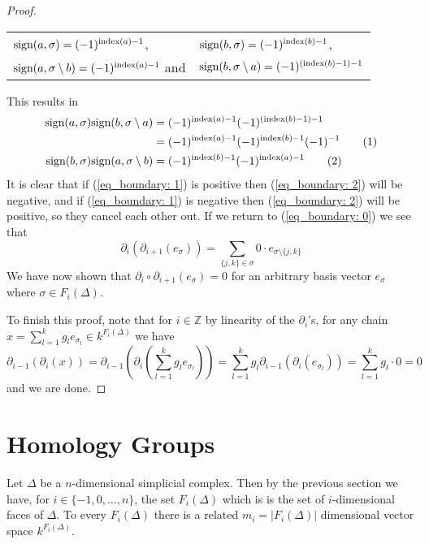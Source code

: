 \documentclass[11pt,a4paper,twoside]{report}
\newcommand\numberthis{\addtocounter{equation}{1}\tag{\theequation}}
\begin{document}
\begin{proof}
\begin{tabular}{l l}
$\textnormal{sign}(a,\sigma) = (-1)^{\textnormal{index}(a)-1}$,  &$\textnormal{sign}(b,\sigma) = (-1)^{\textnormal{index}(b)-1}$,\\
$\textnormal{sign}(a,\sigma\setminus b) = (-1)^{\textnormal{index}(a)-1}$ and &$\textnormal{sign}(b,\sigma\setminus a) = (-1)^{(\textnormal{index}(b)-1)-1}$
\end{tabular}

This results in
\begin{align*}
\textnormal{sign}(a,\sigma)\textnormal{sign}(b,\sigma\setminus a) &= (-1)^{\textnormal{index}(a)-1}(-1)^{(\textnormal{index}(b)-1)-1}\\
&= (-1)^{\textnormal{index}(a)-1}(-1)^{\textnormal{index}(b)-1}(-1)^{-1} \numberthis\label{eq_boundary: 1} \\
\textnormal{sign}(b,\sigma)\textnormal{sign}(a,\sigma\setminus b) &= (-1)^{\textnormal{index}(b)-1}(-1)^{\textnormal{index}(a)-1} \numberthis \label{eq_boundary: 2}\\
\end{align*}
It is clear that if (\ref{eq_boundary: 1}) is positive then (\ref{eq_boundary: 2}) will be negative, and if (\ref{eq_boundary: 1}) is negative then (\ref{eq_boundary: 2}) will be positive, so they cancel each other out. If we return to (\ref{eq_boundary: 0}) we see that 
\begin{equation*}
\partial_i(\partial_{i+1}(e_\sigma))=\sum_{\{j,k\}\in\sigma}0\cdot e_{\sigma\setminus\{j,k\}} 
\end{equation*}
We have now shown that $\partial_i\circ\partial_{i+1}(e_\sigma)=0$ for an arbitrary basis vector $e_\sigma$ where $\sigma\in F_i(\Delta)$. 

To finish this proof, note that for $i \in\mathbb{Z}$ by linearity of the $\partial_i$'s, for any chain $x = \sum_{l=1}^kg_le_{\sigma_l}\in k^{F_i(\Delta)}$ we have 
\begin{equation*}
\partial_{i-1}(\partial_i(x)) = \partial_{i-1}\left(\partial_i\left(\sum_{l=1}^kg_le_{\sigma_l}\right)\right) = \sum_{l=1}^kg_l\partial_{i-1}(\partial_i(e_{\sigma_l}))=\sum_{l=1}^kg_l\cdot 0=0
\end{equation*}
and we are done.
\end{proof}

\section{Homology Groups}
Let $\Delta$ be a $n$-dimensional simplicial complex. Then by the previous section we have, for $i\in\{-1,0,\dots,n\}$, the set $F_i(\Delta)$ which is is the set of $i$-dimensional faces of $\Delta$. To every $F_i(\Delta)$ there is a related $m_i = |F_i(\Delta)|$ dimensional vector space $k^{F_i(\Delta)}$.
\end{document}
